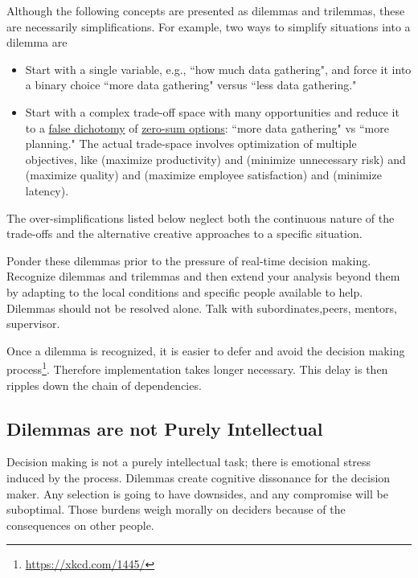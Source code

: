 Although the following concepts are presented as dilemmas and trilemmas, these are necessarily simplifications. For example, two ways to simplify situations into a dilemma are
\begin{itemize}
    \item Start with a single variable, e.g., ``how much data gathering", and force it into a binary choice ``more data gathering" versus ``less data gathering."
    
    \item Start with a complex trade-off space with many opportunities and reduce it to a \href{https://en.wikipedia.org/wiki/False_dilemma}{false dichotomy} of \href{https://en.wikipedia.org/wiki/Zero-sum_thinking}{zero-sum options}: ``more data gathering" vs ``more planning." The actual trade-space involves optimization of multiple objectives, like (maximize productivity) and (minimize unnecessary risk) and (maximize quality) and (maximize employee satisfaction) and (minimize latency). 
\end{itemize}
The over-simplifications listed below neglect both the continuous nature of the trade-offs and the alternative creative approaches to a specific situation. 




Ponder these dilemmas prior to the pressure of real-time decision making.  Recognize dilemmas and trilemmas and then extend your analysis beyond them by adapting to the local conditions and specific people available to help.
Dilemmas should not be resolved alone. Talk with subordinates,peers, mentors, supervisor.


Once a dilemma is recognized, it is easier to defer and avoid the  decision making process\footnote{\href{https://xkcd.com/1445/}{https://xkcd.com/1445/}}. Therefore implementation takes longer necessary. 
This delay is then ripples down the chain of dependencies. 

\subsection*{Dilemmas are not Purely Intellectual}
Decision making is not a purely intellectual task; there is emotional stress induced by the process. Dilemmas create cognitive dissonance for the decision maker. Any selection is going to have downsides, and any compromise will be suboptimal. Those burdens weigh morally on deciders because of the consequences on other people.


